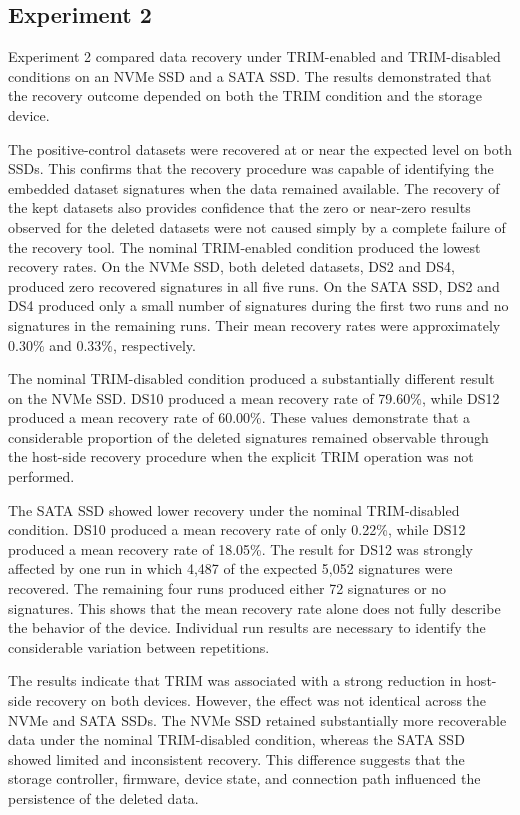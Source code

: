 \subsection*{Experiment 2}
Experiment 2 compared data recovery under TRIM-enabled and TRIM-disabled conditions on an NVMe SSD and a SATA SSD. The results demonstrated that the recovery 
outcome depended on both the TRIM condition and the storage device.

The positive-control datasets were recovered at or near the expected level on both SSDs. This confirms that the recovery procedure was capable of identifying the 
embedded dataset signatures when the data remained available. The recovery of the kept datasets also provides confidence that the zero or near-zero results observed 
for the deleted datasets were not caused simply by a complete failure of the recovery tool. 
The nominal TRIM-enabled condition produced the lowest recovery rates. On the NVMe SSD, both deleted datasets, DS2 and DS4, produced zero recovered signatures in all 
five runs. On the SATA SSD, DS2 and DS4 produced only a small number of signatures during the first two runs and no signatures in the remaining runs. Their mean 
recovery rates were approximately 0.30\% and 0.33\%, respectively. 

The nominal TRIM-disabled condition produced a substantially different result on the NVMe SSD. DS10 produced a mean recovery rate of 79.60\%, while DS12 produced a mean 
recovery rate of 60.00\%. These values demonstrate that a considerable proportion of the deleted signatures remained observable through the host-side recovery procedure 
when the explicit TRIM operation was not performed. 

The SATA SSD showed lower recovery under the nominal TRIM-disabled condition. DS10 produced a mean recovery rate of only 0.22\%, while DS12 produced a mean recovery rate 
of 18.05\%. The result for DS12 was strongly affected by one run in which 4,487 of the expected 5,052 signatures were recovered. The remaining four runs produced either 
72 signatures or no signatures. This shows that the mean recovery rate alone does not fully describe the behavior of the device. Individual run results are necessary 
to identify the considerable variation between repetitions. 

The results indicate that TRIM was associated with a strong reduction in host-side recovery on both devices. However, the effect was not identical across the NVMe and 
SATA SSDs. The NVMe SSD retained substantially more recoverable data under the nominal TRIM-disabled condition, whereas the SATA SSD showed limited and inconsistent 
recovery. This difference suggests that the storage controller, firmware, device state, and connection path influenced the persistence of the deleted data.

